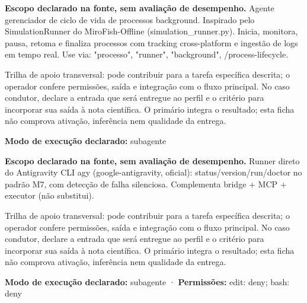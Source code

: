 \begin{descricao}
\textbf{Escopo declarado na fonte, sem avaliação de desempenho.}
Agente gerenciador de ciclo de vida de processos background. Inspirado pelo SimulationRunner do MiroFish-Offline (simulation\_runner.py). Inicia, monitora, pausa, retoma e finaliza processos com tracking cross-platform e ingestão de logs em tempo real. Use via: "processo", "runner", "background", /process-lifecycle.
\end{descricao}

\begin{funcao}
Trilha de apoio transversal: pode contribuir para a tarefa específica descrita; o operador confere permissões, saída e integração com o fluxo principal. No caso condutor, declare a entrada que será entregue ao perfil e o critério para incorporar sua saída à nota científica. O primário integra o resultado; esta ficha não comprova ativação, inferência nem qualidade da entrega.
\end{funcao}

\begin{arquitetura}
\textbf{Modo de execução declarado:} subagente
\end{arquitetura}


\begin{descricao}
\textbf{Escopo declarado na fonte, sem avaliação de desempenho.}
Runner direto do Antigravity CLI agy (google-antigravity, oficial): status/version/run/doctor no padrão M7, com detecção de falha silenciosa. Complementa bridge + MCP + executor (não substitui).
\end{descricao}

\begin{funcao}
Trilha de apoio transversal: pode contribuir para a tarefa específica descrita; o operador confere permissões, saída e integração com o fluxo principal. No caso condutor, declare a entrada que será entregue ao perfil e o critério para incorporar sua saída à nota científica. O primário integra o resultado; esta ficha não comprova ativação, inferência nem qualidade da entrega.
\end{funcao}

\begin{arquitetura}
\textbf{Modo de execução declarado:} subagente · \textbf{Permissões:} edit: deny; bash: deny
\end{arquitetura}

